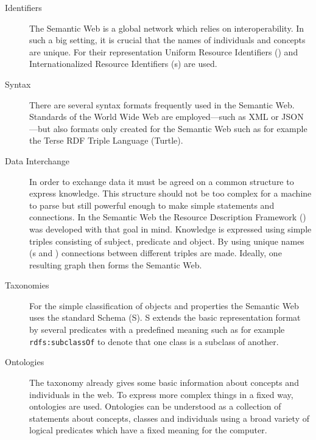 \begin{description}
 \item[Identifiers] The Semantic Web is a global network which relies on interoperability. In such a big setting, it is crucial that the names of individuals and concepts are unique.
 For their representation Uniform Resource Identifiers (\uris) and Internationalized Resource Identifiers (\iri{}s) are used.  
 \item[Syntax] There are several syntax formats frequently used in the Semantic Web. Standards of the World Wide Web are employed---such as XML or JSON---but also formats 
 only created for the Semantic Web such as for example the Terse RDF Triple Language (Turtle). 
 \item[Data Interchange]
In order to exchange data it must be agreed on  a common structure to express knowledge. This 
structure should not be too complex for a machine to parse but still 
powerful enough to make simple statements and connections. 
In the Semantic Web the Resource Description Framework (\rdf) was developed with 
that goal in mind. Knowledge is expressed using simple triples consisting of subject,
predicate and object. By using unique names (\iri{}s and \uris) connections between different triples are made. 
Ideally, one resulting graph then forms the Semantic Web.
 \item[Taxonomies] For the simple classification of objects and properties the Semantic Web uses the standard \rdf Schema (\rdf{}S). \rdf{}S extends the basic representation format 
 \rdf by several predicates with a predefined meaning such as for example \texttt{rdfs:subclassOf} to denote that one class is a subclass of another. 
 \item[Ontologies]
 The taxonomy already gives some basic information about concepts and individuals in the web. To express more complex things in a fixed way, ontologies are used. 
 Ontologies can be understood as a collection of statements about concepts, classes and individuals using a broad variety of logical predicates which have a fixed meaning for the computer.

\end{description}
